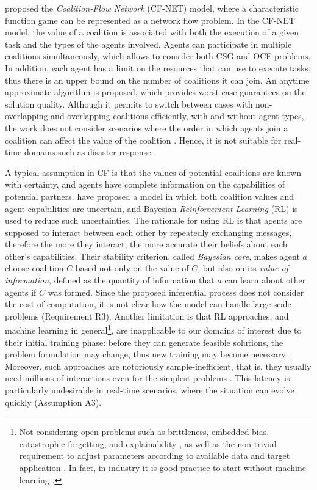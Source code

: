 \cite{rahwan2013coalitional} proposed the \emph{Coalition-Flow Network} (CF-NET) model,
where a characteristic function game can be represented as a network flow problem. In the
CF-NET model, the value of a coalition is associated with both the execution of a given
task and the types of the agents involved. Agents can participate in multiple coalitions
simultaneously, which allows to consider both CSG and OCF problems. In addition, each agent
has a limit on the resources that can use to execute tasks, thus there is an upper bound
on the number of coalitions it can join. An anytime approximate algorithm is proposed,
which provides worst-case guarantees on the solution quality. Although it permits to
switch between cases with non-overlapping and overlapping coalitions efficiently, with and
without agent types, the work does not consider scenarios where the order in
which agents join a coalition can affect the value of the coalition \cite{michalak2014}.
Hence, it is not suitable for real-time domains such as disaster response.

A typical assumption in CF is that the values of potential coalitions are known with
certainty, and agents have complete information on the capabilities of potential partners.
\cite{chalkiadakis2004,chalkiadakis2012} have proposed a model in which both coalition
values and agent capabilities are uncertain, and Bayesian \emph{Reinforcement Learning}
(RL) \cite{brl2015survey} is used to reduce such uncertainties. The rationale for using RL
is that agents are supposed to interact between each other by repeatedly exchanging
messages, therefore the more they interact, the more accurate their beliefs about each
other's capabilities.
Their stability criterion, called \emph{Bayesian core}, makes agent $a$ choose coalition
$C$ based not only on the value of $C$, but also on its \emph{value of information},
defined as the quantity of information that $a$ can learn about other agents if $C$ was
formed. Since the proposed inferential process does not consider the cost of computation,
it is not clear how the model can handle large-scale problems (Requirement R3). Another
limitation is that RL approaches, and machine learning in general\footnote{Not considering
open problems such as brittleness, embedded bias, catastrophic forgetting, and
explainability \cite{ml-failures,dehghani2021,roy2021}, as well as the non-trivial
requirement to adjust parameters according to available data and target application
\cite{vasudevan2021}. In fact, in industry it is good practice to start without machine
learning \cite{yan2021}.}, are inapplicable to our domains of interest due to their
initial training phase: before they can generate feasible solutions, the problem
formulation may change, thus new training may become necessary \cite{tsimenidis2020}.
Moreover, such approaches are notoriously sample-inefficient, that is, they usually need
millions of interactions even for the simplest problems \cite{yang2021survey}. This
latency is particularly undesirable in real-time scenarios, where the situation can evolve
quickly (Assumption A3).

